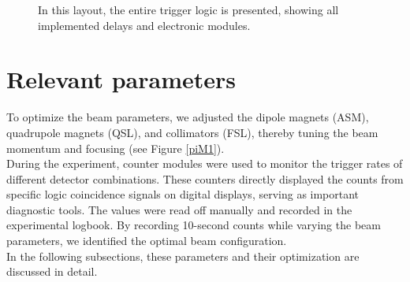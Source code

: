 \documentclass[11pt,a4paper]{article}
\begin{document}
\begin{figure}[ht]
{
}%
\caption{In this layout, the entire trigger logic is presented, showing all implemented delays and electronic modules.}
\end{figure}

\section{Relevant parameters}

To optimize the beam parameters, we adjusted the dipole magnets (ASM), quadrupole magnets (QSL), and collimators (FSL), thereby tuning the beam momentum and focusing (see Figure \ref{piM1}).\\
During the experiment, counter modules were used to monitor the trigger rates of different detector combinations.
These counters directly displayed the counts from specific logic coincidence signals on digital displays, serving as important diagnostic tools. The values were read off manually and recorded in the experimental logbook. By recording 10-second counts while varying the beam parameters, we identified the optimal beam configuration.\\



In the following subsections, these parameters and their optimization are discussed in detail.
\end{document}
